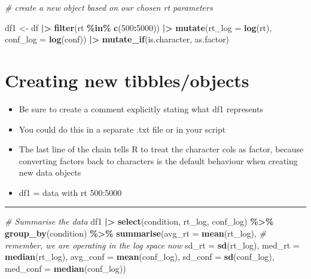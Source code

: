 \documentclass[
]{article}
\newenvironment{Shaded}{\begin{snugshade}}{\end{snugshade}}
\newcommand{\AttributeTok}[1]{\textcolor[rgb]{0.13,0.29,0.53}{#1}}
\newcommand{\CommentTok}[1]{\textcolor[rgb]{0.56,0.35,0.01}{\textit{#1}}}
\newcommand{\DecValTok}[1]{\textcolor[rgb]{0.00,0.00,0.81}{#1}}
\newcommand{\FunctionTok}[1]{\textcolor[rgb]{0.13,0.29,0.53}{\textbf{#1}}}
\newcommand{\NormalTok}[1]{#1}
\newcommand{\OtherTok}[1]{\textcolor[rgb]{0.56,0.35,0.01}{#1}}
\newcommand{\SpecialCharTok}[1]{\textcolor[rgb]{0.81,0.36,0.00}{\textbf{#1}}}
\providecommand{\tightlist}{%
  \setlength{\itemsep}{0pt}\setlength{\parskip}{0pt}}
\begin{document}
\begin{Shaded}
\begin{Highlighting}[]
\CommentTok{\# create a new object based on our chosen rt parameters}

\NormalTok{df1 }\OtherTok{\textless{}{-}}
\NormalTok{  df }\SpecialCharTok{|\textgreater{}}
  \FunctionTok{filter}\NormalTok{(rt }\SpecialCharTok{\%in\%} \FunctionTok{c}\NormalTok{(}\DecValTok{500}\SpecialCharTok{:}\DecValTok{5000}\NormalTok{)) }\SpecialCharTok{|\textgreater{}}
  \FunctionTok{mutate}\NormalTok{(}\AttributeTok{rt\_log =} \FunctionTok{log}\NormalTok{(rt),}
         \AttributeTok{conf\_log =} \FunctionTok{log}\NormalTok{(conf)) }\SpecialCharTok{|\textgreater{}}
  \FunctionTok{mutate\_if}\NormalTok{(is.character, as.factor)}
\end{Highlighting}
\end{Shaded}

\hypertarget{creating-new-tibblesobjects}{%
\section{Creating new
tibbles/objects}\label{creating-new-tibblesobjects}}

\begin{itemize}
\tightlist
\item
  Be sure to create a comment explicitly stating what df1 represents
\item
  You could do this in a separate .txt file or in your script
\item
  The last line of the chain tells R to treat the character cols as
  factor, because converting factors back to characters is the default
  behaviour when creating new data objects
\item
  df1 = data with rt 500:5000
\end{itemize}

\begin{center}\rule{0.5\linewidth}{0.5pt}\end{center}

\begin{Shaded}
\begin{Highlighting}[]
\CommentTok{\# Summarise the data}
\NormalTok{df1 }\SpecialCharTok{|\textgreater{}}
  \FunctionTok{select}\NormalTok{(condition, }
\NormalTok{         rt\_log, }
\NormalTok{         conf\_log) }\SpecialCharTok{\%\textgreater{}\%}
  \FunctionTok{group\_by}\NormalTok{(condition) }\SpecialCharTok{\%\textgreater{}\%} 
  \FunctionTok{summarise}\NormalTok{(}\AttributeTok{avg\_rt =} \FunctionTok{mean}\NormalTok{(rt\_log), }\CommentTok{\# remember, we are operating in the log space now}
            \AttributeTok{sd\_rt =} \FunctionTok{sd}\NormalTok{(rt\_log),}
            \AttributeTok{med\_rt =} \FunctionTok{median}\NormalTok{(rt\_log),}
            \AttributeTok{avg\_conf =} \FunctionTok{mean}\NormalTok{(conf\_log),}
            \AttributeTok{sd\_conf =} \FunctionTok{sd}\NormalTok{(conf\_log),}
            \AttributeTok{med\_conf =} \FunctionTok{median}\NormalTok{(conf\_log))}
\end{Highlighting}
\end{Shaded}
\end{document}
